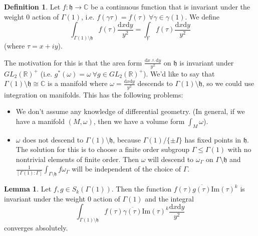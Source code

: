\documentclass{article}
\theoremstyle{definition}
\newtheorem{lemma}[theorem]{Lemma}
\newtheorem{defn}{Definition}[section]
\begin{document}
\begin{defn}
    Let $f : \mathfrak{h} \to \mathbb{C}$ be a continuous function that is invariant under the weight 0 action of $\Gamma(1)$, i.e. $f(\gamma \tau) = f(\tau) ~\forall \gamma \in \gamma(1)$. We define \[
    \int_{\Gamma(1)\setminus \mathfrak{h}}^{} f(\tau)\frac{\mathrm{d}x\mathrm{d}y}{y^2} = \int_{\mathfrak{f'}}^{} f(\tau) \frac{\mathrm{d}x\mathrm{d}y}{y^2}
    \]
    (where $\tau = x+iy$). 
\end{defn}
The motivation for this is that the area form $\frac{\mathrm{d}x \wedge \mathrm{d}y}{y^2}$ on $\mathfrak{h}$ is invariant under $GL_2(\mathbb{R})^+$ (i.e. $g^*(\omega) = \omega ~\forall g \in GL_2(\mathbb{R})^+$). We'd like to say that $\Gamma(1)\setminus \mathfrak{h} \cong \mathbb{C}$ is a manifold where $\omega = \frac{\mathrm{d}x\mathrm{d}y}{y^2}$ descends to $\Gamma(1)\setminus \mathfrak{h}$, so we could use integration on manifolds. This has the following problems:
\begin{itemize}
    \item We don't assume any knowledge of differential geometry. (In general, if we have a manifold $(M,\omega)$, then we have a volume form $\int_{M}^{} \omega$).
    \item $\omega$ does not descend to $\Gamma(1)\setminus \mathfrak{h}$, because $\Gamma(1)/\{\pm I\}$ has fixed points in $\mathfrak{h}$. The solution for this is to choose a finite order subgroup $\Gamma \le \Gamma(1)$ with no nontrivial elements of finite order. Then $\omega$ will descend to $\omega_{\Gamma}$ on $\Gamma\setminus \mathfrak{h}$ and $\frac{1}{[\Gamma(1):\Gamma]}\int_{\Gamma\setminus \mathfrak{h}} f \omega_{\Gamma}$ will be independent of the choice of $\Gamma$.
\end{itemize}
\begin{lemma}
    Let $f,g \in S_k(\Gamma(1))$. Then the function $f(\tau)\overline{g(\tau)}\text{Im}(\tau)^k$ is invariant under the weight 0 action of $\Gamma(1)$ and the integral $$\int_{\Gamma(1)\setminus \mathfrak{h}}^{} f(\tau)\overline{\gamma(\tau)}\text{Im}(\tau)^k \frac{\mathrm{d}x\mathrm{d}y}{y^2}$$ converges absolutely.
\end{lemma}
\end{document}
